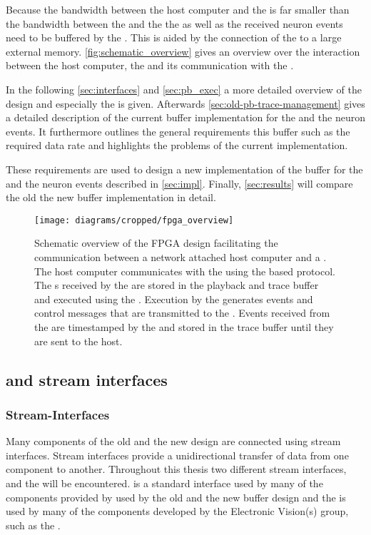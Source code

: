 Because the bandwidth between the host computer and the \FPGA{} is far smaller than the bandwidth between the \FPGA{} and the \ASIC{} the \PlaybackProgram{} as well as the received neuron events need to be buffered by the \FPGA{}. This is aided by the connection of the \FPGA{} to a large external \DDR{} memory.
\autoref{fig:schematic_overview} gives an overview over the interaction between the host computer, the \FPGA{} and its communication with the \HICANNX{} \ASIC{}.

In the following \autoref{sec:interfaces} and \autoref{sec:pb_exec} a more detailed overview of the \FPGA{} design and especially the \pbexec{} is given. Afterwards \autoref{sec:old-pb-trace-management} gives a detailed description of the current buffer implementation for the \PlaybackProgram{} and the neuron events. It furthermore outlines the general requirements this buffer such as the required data rate and highlights the problems of the current implementation.

These requirements are used to design a new implementation of the buffer for the \PlaybackProgram{} and the neuron events described in \autoref{sec:impl}. Finally, \autoref{sec:results} will compare the old the new buffer implementation in detail.

\begin{figure}
\centerline{\texttt{[image: diagrams/cropped/fpga\_overview]}}
\caption{Schematic overview of the FPGA design facilitating the communication between a network attached host computer and a \HICANNX{} \ASIC{}. The host computer communicates with the \FPGA{} using the \UDP{} based \HostARQ{} protocol. The \PlaybackProgram{}s received by the \FPGA{} are stored in the playback and trace buffer and executed using the \pbexec{}. Execution by the \pbexec{} generates events and control messages that are transmitted to the \ASIC{}. Events received from the \ASIC{} are timestamped by the \pbexec{} and stored in the trace buffer until they are sent to the host.}\label{fig:schematic_overview}
\end{figure}


\subsection{\AXI{} and stream interfaces}\label{sec:interfaces}
\subsubsection{Stream-Interfaces}
Many components of the old and the new \FPGA{} design are connected using stream interfaces. Stream interfaces provide a unidirectional transfer of data from one component to another.
Throughout this thesis two different stream interfaces, \AXIStream{} and the \ValidNextStream{} will be encountered. \AXIStream{} is a standard interface used by many of the components provided by \Xilinx{} used by the old and the new buffer design and the \ValidNextStream{} is used by many of the components developed by the Electronic Vision(s) group, such as the \pbexec{}.


